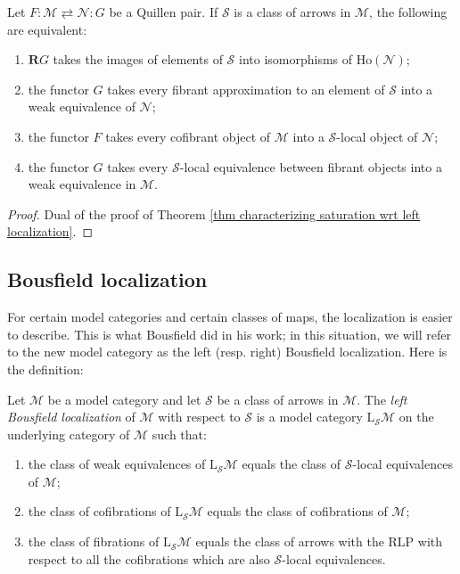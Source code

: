 \begin{thm} \label{thm characterizing saturation wrt right localization}
Let $F \colon \mathcal M \rightleftarrows \mathcal N \colon G$ be a Quillen pair. If $\mathcal S$ is a class of arrows in $\mathcal M$, the following are equivalent:
\begin{enumerate}
\item $\mathbf R G$ takes the images of elements of $\mathcal S$ into isomorphisms of $\mathrm{Ho}(\mathcal N)$;
\item the functor $G$ takes every fibrant approximation to an element of $\mathcal S$ into a weak equivalence of $\mathcal N$;
\item the functor $F$ takes every cofibrant object of $\mathcal M$ into a $\mathcal S$-local object of $\mathcal N$;
\item the functor $G$ takes every $\mathcal S$-local equivalence between fibrant objects into a weak equivalence in $\mathcal M$.
\end{enumerate}
\end{thm}

\begin{proof}
Dual of the proof of Theorem \ref{thm characterizing saturation wrt left localization}.
\end{proof}

\subsection{Bousfield localization}

For certain model categories and certain classes of maps, the localization is easier to describe. This is what Bousfield did in his work; in this situation, we will refer to the new model category as the left (resp. right) Bousfield localization. Here is the definition:

\begin{defin}
Let $\mathcal M$ be a model category and let $\mathcal S$ be a class of arrows in $\mathcal M$. The \emph{left Bousfield localization} of $\mathcal M$ with respect to $\mathcal S$ is a model category $\mathrm L_{\mathcal S}\mathcal M$ on the underlying category of $\mathcal M$ such that:
\begin{enumerate}
\item the class of weak equivalences of $\mathrm L_{\mathcal S} \mathcal M$ equals the class of $\mathcal S$-local equivalences of $\mathcal M$;
\item the class of cofibrations of $\mathrm L_{\mathcal S} \mathcal M$ equals the class of cofibrations of $\mathcal M$;
\item the class of fibrations of $\mathrm L_{\mathcal S} \mathcal M$ equals the class of arrows with the RLP with respect to all the cofibrations which are also $\mathcal S$-local equivalences.
\end{enumerate}
\end{defin}

